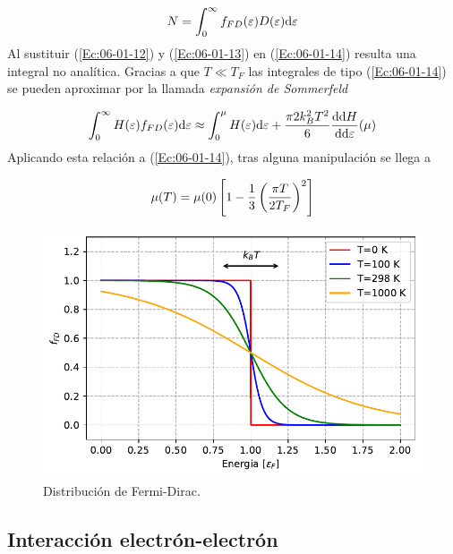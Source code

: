 \begin{equation}
	N=\int_0^{\infty} f_{FD} (\varepsilon) D (\varepsilon) \mathrm{d} \varepsilon  \label{Ec:06-01-14}
\end{equation}
Al sustituir (\ref{Ec:06-01-12}) y (\ref{Ec:06-01-13}) en (\ref{Ec:06-01-14})  resulta una integral no analítica. Gracias a que $T\ll T_F$ las integrales de tipo (\ref{Ec:06-01-14}) se pueden aproximar por la llamada \textit{expansión de Sommerfeld} 

\begin{eqnarray}
	\int_{0}^{\infty} H(\varepsilon) f_{FD} (\varepsilon)  \mathrm{d} \varepsilon \approx \int_0^\mu H(\varepsilon) \mathrm{d} \varepsilon + \frac{\pi2 k_B^2 T^2}{6} \frac{\mathrm{d} \mathrm{d} H}{\mathrm{d} \mathrm{d} \varepsilon} (\mu)
\end{eqnarray}
Aplicando esta relación a (\ref{Ec:06-01-14}), tras alguna manipulación se llega a 

\begin{equation}
	\mu (T) = \mu(0) \left[ 1-\frac{1}{3} \left( \frac{\pi T}{2 T_F} \right)^2 \right]
\end{equation}
 



\begin{figure}[h!] \centering
    \includegraphics[scale=0.75]{Cuerpo/Ch_06/06-Fermi-Dirac.pdf}
    \caption{Distribución de Fermi-Dirac.}
    \label{Fig:06-03}
\end{figure}    

\subsection{Interacción electrón-electrón}

